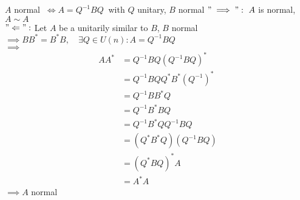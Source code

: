 


\begin{SolutionSheet}[\ref{sheet2}]
\begin{onehalfspace}

  \begin{Solution}
    \Claim $A$ normal $\ \iff A = Q^{-1}BQ \ $ with $Q$ unitary, $B$ normal
    \Claim $"\implies ": \ A$ is normal, $A \sim A$ \\
    $"\Leftarrow ":$ Let $A$ be a unitarily similar to $B$, $B$ normal \\
    $ \implies BB^* = B^*B, \quad\exists Q \in U(n): A = Q^{-1}BQ$ \\
    $ \implies$ \begin{align*}
      AA^* &= Q^{-1}BQ(Q^{-1}BQ)^* \\
      &= Q^{-1}BQ Q^* B^* (Q^{-1})^* \\
      &= Q^{-1} BB^*Q \\
      &= Q^{-1} B^*BQ \\
      &= Q^{-1} B^* QQ^{-1}BQ \\
      &= (Q^* B^* Q)(Q^{-1}BQ) \\
      &= (Q^* B Q)^* A \\
      &= A^* A
    \end{align*}
    $ \implies A$ normal
  \end{Solution}


\end{onehalfspace}
\end{SolutionSheet}
